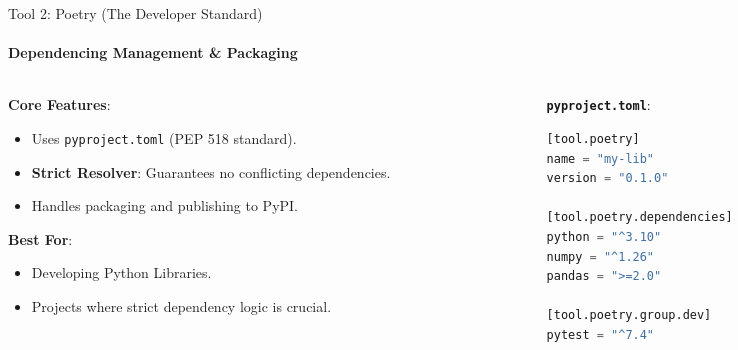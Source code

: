 \documentclass[aspectratio=169]{beamer}
\begin{document}
\begin{frame}[fragile,t]{Tool 2: Poetry (The Developer Standard)}
    \framesubtitle{Dependencing Management \& Packaging}
    \begin{columns}[T,onlytextwidth]
        \begin{column}{0.60\textwidth}
            \textbf{Core Features}:
            \begin{itemize}
                \item Uses \texttt{pyproject.toml} (PEP 518 standard).
                \item \textbf{Strict Resolver}: Guarantees no conflicting dependencies.
                \item Handles packaging and publishing to PyPI.
            \end{itemize}
            
            \textbf{Best For}:
            \begin{itemize}
                \item Developing Python Libraries.
                \item Projects where strict dependency logic is crucial.
            \end{itemize}
        \end{column}
        \begin{column}{0.38\textwidth}
            \scriptsize \textbf{\texttt{pyproject.toml}}:
            \begin{lstlisting}[language=Python, basicstyle=\tiny\ttfamily, keywordstyle=\color{blue}, stringstyle=\color{green!50!black}, frame=single, backgroundcolor=\color{white}]
[tool.poetry]
name = "my-lib"
version = "0.1.0"

[tool.poetry.dependencies]
python = "^3.10"
numpy = "^1.26"
pandas = ">=2.0"

[tool.poetry.group.dev]
pytest = "^7.4"
            \end{lstlisting}
        \end{column}
    \end{columns}
\end{frame}
\end{document}
